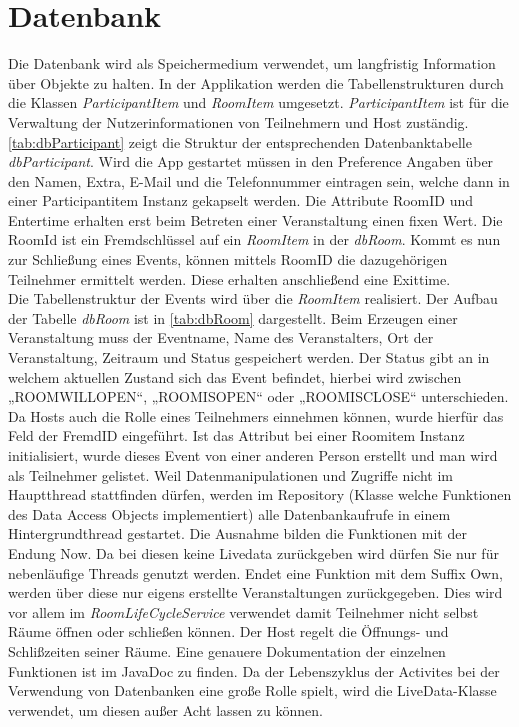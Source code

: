 \section{Datenbank}
\label{sec:Datenbank}
Die Datenbank wird als Speichermedium verwendet, um langfristig Information über Objekte zu halten. 
In der Applikation werden die Tabellenstrukturen durch die Klassen \textit{ParticipantItem} und \textit{RoomItem} umgesetzt. 
\textit{ParticipantItem} ist für die Verwaltung der Nutzerinformationen von Teilnehmern und Host zuständig.\\
 \cref{tab:dbParticipant} zeigt die Struktur der entsprechenden Datenbanktabelle \textit{dbParticipant}.
 Wird die App gestartet müssen in den Preference Angaben über den Namen, Extra, E-Mail und die Telefonnummer eintragen sein, welche dann in einer Participantitem Instanz gekapselt werden. 
Die Attribute RoomID und Entertime erhalten erst beim Betreten einer Veranstaltung einen fixen Wert. 
Die RoomId ist ein Fremdschlüssel auf ein \textit{RoomItem }in der \textit{dbRoom}.
Kommt es nun zur Schließung eines Events, können mittels RoomID die dazugehörigen Teilnehmer ermittelt werden. 
Diese erhalten anschließend eine Exittime.\\
Die Tabellenstruktur der Events wird über die \textit{RoomItem} realisiert. Der Aufbau der Tabelle \textit{dbRoom} ist in \cref{tab:dbRoom} dargestellt. 
Beim Erzeugen einer Veranstaltung muss der Eventname, Name des Veranstalters, Ort der Veranstaltung, Zeitraum und Status gespeichert werden. 
Der Status gibt an in welchem aktuellen Zustand sich das Event befindet, hierbei wird zwischen „ROOMWILLOPEN“, „ROOMISOPEN“ oder „ROOMISCLOSE“ unterschieden.
Da Hosts auch die Rolle eines Teilnehmers einnehmen können, wurde hierfür das Feld der FremdID eingeführt. 
Ist das Attribut bei einer Roomitem Instanz initialisiert, wurde dieses Event von einer anderen Person erstellt und man wird als Teilnehmer gelistet.
Weil Datenmanipulationen und Zugriffe nicht im Hauptthread stattfinden dürfen, werden im Repository (Klasse welche Funktionen des Data Access Objects implementiert) alle Datenbankaufrufe in einem Hintergrundthread gestartet.
Die Ausnahme bilden die Funktionen mit der Endung Now. 
Da bei diesen keine Livedata zurückgeben wird dürfen Sie nur für nebenläufige Threads genutzt werden. 
Endet eine Funktion mit dem Suffix Own, werden über diese nur eigens erstellte Veranstaltungen zurückgegeben.
Dies wird vor allem im \textit{RoomLifeCycleService} verwendet damit Teilnehmer nicht selbst Räume öffnen oder schließen können.
Der Host regelt die Öffnungs- und Schlißzeiten seiner Räume.
Eine genauere Dokumentation der einzelnen Funktionen ist im JavaDoc zu finden.
Da der Lebenszyklus der Activites bei der Verwendung von Datenbanken eine große Rolle  spielt, wird die LiveData-Klasse verwendet, um diesen außer Acht lassen zu können. 

